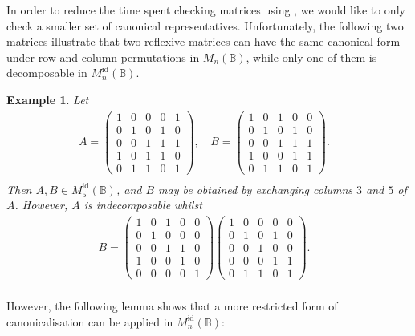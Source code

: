 \documentclass[11pt]{article}
\newtheorem{exa}[thm]{Example}
\newenvironment{ex}{\begin{exa}\rm}{\end{exa}}
\numberwithin{equation}{section}
\newcommand{\B}{\mathbb{B}}
\newcommand{\Bn}{M_n(\B)}
\newcommand{\Refn}{M_n^{\text{id}}(\B)}
\newcommand{\Ref}[1]{M_{#1}^{\text{id}}(\B)}
\begin{document}
In order to reduce the time spent checking matrices using
, we would like to only check a smaller set of
canonical representatives. Unfortunately, the following two matrices illustrate
that two reflexive matrices can have the same canonical form under row and
column permutations in $\Bn$, while only one of them is decomposable in $\Refn$. 
\begin{ex}
  Let
\begin{align*}
  A = \begin{pmatrix}
    1 & 0 & 0 & 0 & 1 \\
    0 & 1 & 0 & 1 & 0 \\
    0 & 0 & 1 & 1 & 1 \\
    1 & 0 & 1 & 1 & 0 \\
    0 & 1 & 1 & 0 & 1 
  \end{pmatrix}\text{, }&
  B = \begin{pmatrix}
    1 & 0 & 1 & 0 & 0 \\
    0 & 1 & 0 & 1 & 0 \\
    0 & 0 & 1 & 1 & 1 \\
    1 & 0 & 0 & 1 & 1 \\
    0 & 1 & 1 & 0 & 1 
  \end{pmatrix}.&\\
\end{align*}
Then $A, B \in \Ref{5}$, and $B$ may be obtained by exchanging columns $3$ and
$5$ of $A$. However, $A$ is indecomposable whilst
\begin{align*}
  B = \begin{pmatrix}
    1 & 0 & 1 & 0 & 0 \\
    0 & 1 & 0 & 0 & 0 \\
    0 & 0 & 1 & 1 & 0 \\
    1 & 0 & 0 & 1 & 0 \\
    0 & 0 & 0 & 0 & 1 
  \end{pmatrix}
  \begin{pmatrix}
    1 & 0 & 0 & 0 & 0 \\
    0 & 1 & 0 & 1 & 0 \\
    0 & 0 & 1 & 0 & 0 \\
    0 & 0 & 0 & 1 & 1 \\
    0 & 1 & 1 & 0 & 1 
  \end{pmatrix}.&\\
\end{align*}
\end{ex} 

However, the following lemma shows that a more restricted form of
canonicalisation can be applied in $\Refn$:
\end{document}
